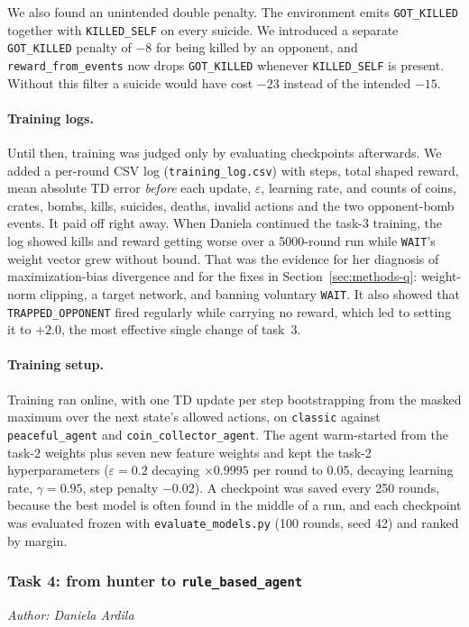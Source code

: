 \documentclass[11pt]{article}
\newcommand{\authorline}[1]{\noindent\textit{Author: #1}\par\medskip}
\newcommand{\code}[1]{\texttt{#1}}
\begin{document}
We also found an unintended double penalty. The environment emits \code{GOT\_KILLED} together
with \code{KILLED\_SELF} on every suicide. We introduced a separate \code{GOT\_KILLED} penalty
of $-8$ for being killed by an opponent, and \code{reward\_from\_events} now drops
\code{GOT\_KILLED} whenever \code{KILLED\_SELF} is present. Without this filter a suicide
would have cost $-23$ instead of the intended $-15$.

\paragraph{Training logs.}
Until then, training was judged only by evaluating checkpoints afterwards. We added a
per-round CSV log (\code{training\_log.csv}) with steps, total shaped reward, mean absolute
TD error \emph{before} each update, $\varepsilon$, learning rate, and counts of coins,
crates, bombs, kills, suicides, deaths, invalid actions and the two opponent-bomb events. It
paid off right away. When Daniela continued the task-3 training, the log showed kills and
reward getting worse over a 5000-round run while \code{WAIT}'s weight vector grew without
bound. That was the evidence for her diagnosis of maximization-bias divergence and for the
fixes in Section~\ref{sec:methods-q}: weight-norm clipping, a target network,
and banning voluntary \code{WAIT}. It also showed that \code{TRAPPED\_OPPONENT} fired
regularly while carrying no reward, which led to setting it to $+2.0$, the most effective
single change of task~3.

\paragraph{Training setup.}
Training ran online, with one TD update per step bootstrapping from the masked maximum over
the next state's allowed actions, on \code{classic} against \code{peaceful\_agent} and
\code{coin\_collector\_agent}. The agent warm-started from the task-2 weights plus seven new
feature weights and kept the task-2 hyperparameters ($\varepsilon = 0.2$ decaying
$\times0.9995$ per round to 0.05, decaying learning rate, $\gamma = 0.95$, step penalty
$-0.02$). A checkpoint was saved every 250 rounds, because the best model is often found in
the middle of a run, and each checkpoint was evaluated frozen with \code{evaluate\_models.py}
(100 rounds, seed 42) and ranked by margin.


\subsubsection{Task 4: from hunter to \code{rule\_based\_agent}}
\label{sec:q-task4}
\authorline{Daniela Ardila}
 
\end{document}
